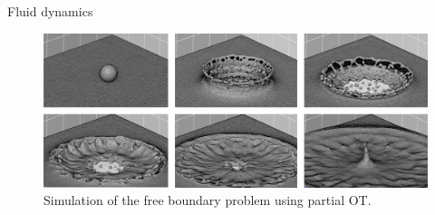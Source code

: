 \begin{frame}{Fluid dynamics}
    \footnotesize
    \begin{figure}
        \centering
        \captionsetup{font=scriptsize}
        \centering
        \includegraphics[width=\textwidth]{png/cfd.jpg}
        \caption{Simulation of the free boundary problem using partial OT.}
    \end{figure}
\end{frame}